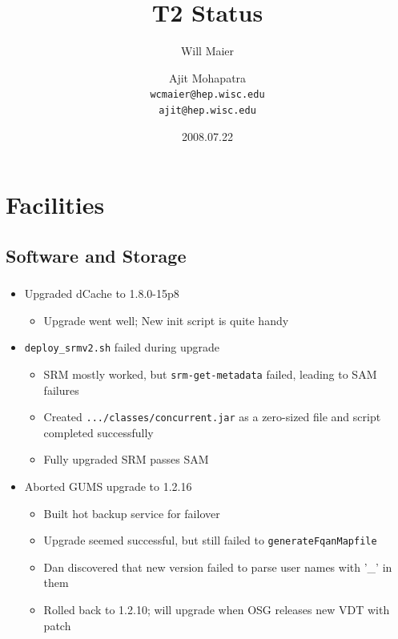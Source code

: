 \documentclass{beamer}
\title{T2 Status}
\author[Maier, Mohapatra]{
    Will Maier \and Ajit Mohapatra\\ 
    {\tt wcmaier@hep.wisc.edu}\\
    {\tt ajit@hep.wisc.edu}}
\institute[Wisconsin]{University of Wisconsin - High Energy Physics}
\date{2008.07.22}
\begin{document}
\begin{frame}
    \titlepage
\end{frame}



\section{Facilities}
\subsection{Software and Storage}
\begin{frame}
\frametitle{}
\begin{itemize}
    \item Upgraded dCache to 1.8.0-15p8
    \begin{itemize}
        \item Upgrade went well; New init script is quite handy
    \end{itemize}
    \item {\tt deploy\_srmv2.sh} failed during upgrade
    \begin{itemize}
        \item SRM mostly worked, but {\tt srm-get-metadata} failed, leading to SAM failures
        \item Created {\tt .../classes/concurrent.jar} as a zero-sized file and script completed successfully
        \item Fully upgraded SRM passes SAM
    \end{itemize}
    \item Aborted GUMS upgrade to 1.2.16
    \begin{itemize}
        \item Built hot backup service for failover
        \item Upgrade seemed successful, but still failed to {\tt generateFqanMapfile}
        \item Dan discovered that new version failed to parse user names with '\_' in them
        \item Rolled back to 1.2.10; will upgrade when OSG releases new VDT with patch
    \end{itemize}
\end{itemize}
\end{frame}
\end{document}
